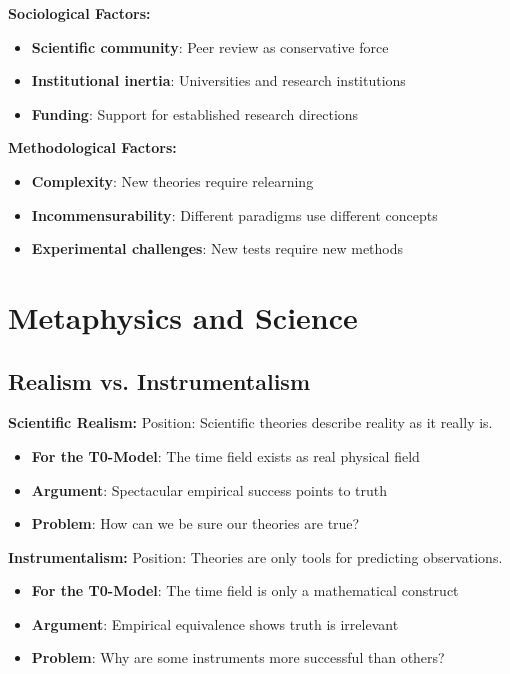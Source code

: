 \documentclass[12pt,a4paper]{report}
\begin{document}
\textbf{Sociological Factors:}
\begin{itemize}
	\item \textbf{Scientific community}: Peer review as conservative force
	\item \textbf{Institutional inertia}: Universities and research institutions
	\item \textbf{Funding}: Support for established research directions
\end{itemize}

\textbf{Methodological Factors:}
\begin{itemize}
	\item \textbf{Complexity}: New theories require relearning
	\item \textbf{Incommensurability}: Different paradigms use different concepts
	\item \textbf{Experimental challenges}: New tests require new methods
\end{itemize}

	\section{Metaphysics and Science}\label{sec:metaphysics_science}
	
	\subsection{Realism vs. Instrumentalism}\label{subsec:realism_instrumentalism}
	
	\textbf{Scientific Realism:}
	Position: Scientific theories describe reality as it really is.
	\begin{itemize}
		\item \textbf{For the T0-Model}: The time field exists as real physical field
		\item \textbf{Argument}: Spectacular empirical success points to truth
		\item \textbf{Problem}: How can we be sure our theories are true?
	\end{itemize}
	
	\textbf{Instrumentalism:}
	Position: Theories are only tools for predicting observations.
	\begin{itemize}
		\item \textbf{For the T0-Model}: The time field is only a mathematical construct
		\item \textbf{Argument}: Empirical equivalence shows truth is irrelevant
		\item \textbf{Problem}: Why are some instruments more successful than others?
	\end{itemize}
	
\end{document}
